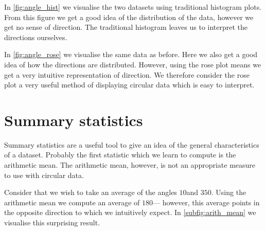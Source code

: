 In \cref{fig:angle_hist} we visualise the two datasets using traditional histogram plots. From this figure we get a good idea of the distribution of the data, however we get no sense of direction. The traditional histogram leaves us to interpret the directions ourselves.

In \cref{fig:angle_rose} we visualise the same data as before. Here we also get a good idea of how the directions are distributed. However, using the rose plot means we get a very intuitive representation of direction. We therefore consider the rose plot a very useful method of displaying circular data which is easy to interpret.

\section{Summary statistics}
\label{sec:summary_stats}

Summary statistics are a useful tool to give an idea of the general characteristics of a dataset. Probably the first statistic which we learn to compute is the arithmetic mean. The arithmetic mean, however, is not an appropriate measure to use with circular data.

Consider that we wish to take an average of the angles $10$\textdegree and $350$\textdegree. Using the arithmetic mean we compute an average of $180$\textdegree --- however, this average points in the opposite direction to which we intuitively expect. In \cref{subfig:arith_mean} we visualise this surprising result.

